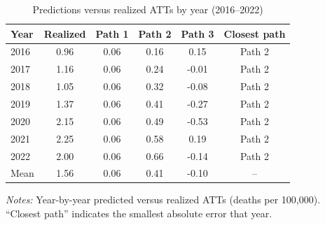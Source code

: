 \begin{table}[htbp]
\centering
\caption{Predictions versus realized ATTs by year (2016--2022)}
\label{tab:app_yearly}
\begin{tabular}{lccccc}
\toprule
Year & Realized & Path 1 & Path 2 & Path 3 & Closest path \\
\midrule
2016 & 0.96 & 0.06 & 0.16 & 0.15 & Path 2 \\
2017 & 1.16 & 0.06 & 0.24 & -0.01 & Path 2 \\
2018 & 1.05 & 0.06 & 0.32 & -0.08 & Path 2 \\
2019 & 1.37 & 0.06 & 0.41 & -0.27 & Path 2 \\
2020 & 2.15 & 0.06 & 0.49 & -0.53 & Path 2 \\
2021 & 2.25 & 0.06 & 0.58 & 0.19 & Path 2 \\
2022 & 2.00 & 0.06 & 0.66 & -0.14 & Path 2 \\
\midrule
Mean & 1.56 & 0.06 & 0.41 & -0.10 & -- \\
\bottomrule
\end{tabular}
\begin{minipage}{\textwidth}
\vspace{0.1in}\footnotesize
\textit{Notes:} Year-by-year predicted versus realized ATTs (deaths per 100{,}000).
``Closest path'' indicates the smallest absolute error that year.
\end{minipage}
\end{table}
